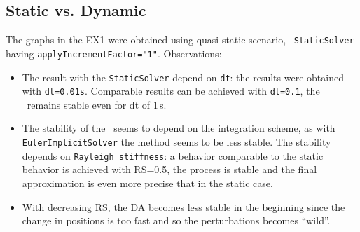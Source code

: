 \documentclass[10pt]{article}
\begin{document}
\subsection{Static vs. Dynamic}
The graphs in the EX1 were obtained using quasi-static scenario, \ie\ \texttt{StaticSolver} having \texttt{applyIncrementFactor="1"}. Observations:
\begin{itemize}
 \item The result with the \texttt{StaticSolver} depend on \texttt{dt}: the results were obtained with \texttt{dt=0.01s}. Comparable results can be
achieved with \texttt{dt=0.1}, 
 the \ssda\ remains stable even for dt of 1\,s.
 \item The stability of the \ssda\ seems to depend on the integration scheme, as with \texttt{EulerImplicitSolver} the method seems to be less stable.
The stability depends on \texttt{Rayleigh stiffness}: a behavior comparable to the static behavior is achieved with RS=0.5, the process is stable and
the final approximation is even more precise that in the static case. 
\item With decreasing RS, the DA becomes less stable in the beginning since the change in positions is too fast and so the perturbations becomes
``wild''. 
\end{itemize}
\end{document}
